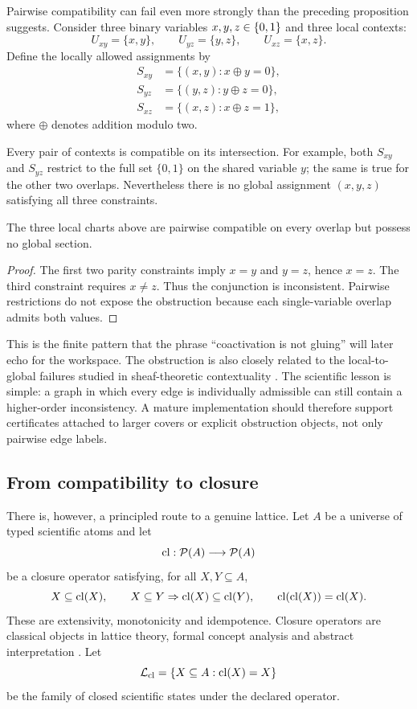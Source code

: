Pairwise compatibility can fail even more strongly than the preceding proposition suggests. Consider three binary variables \(x,y,z\in\{0,1\}\) and three local contexts:
\[
U_{xy}=\{x,y\},\qquad U_{yz}=\{y,z\},\qquad U_{xz}=\{x,z\}.
\]
Define the locally allowed assignments by
\[
\begin{aligned}
S_{xy}&=\{(x,y):x\oplus y=0\},\\
S_{yz}&=\{(y,z):y\oplus z=0\},\\
S_{xz}&=\{(x,z):x\oplus z=1\},
\end{aligned}
\]
where \(\oplus\) denotes addition modulo two.

Every pair of contexts is compatible on its intersection. For example, both \(S_{xy}\) and \(S_{yz}\) restrict to the full set \(\{0,1\}\) on the shared variable \(y\); the same is true for the other two overlaps. Nevertheless there is no global assignment \((x,y,z)\) satisfying all three constraints.

\begin{proposition}
The three local charts above are pairwise compatible on every overlap but possess no global section.
\end{proposition}

\begin{proof}
The first two parity constraints imply \(x=y\) and \(y=z\), hence \(x=z\). The third constraint requires \(x\ne z\). Thus the conjunction is inconsistent. Pairwise restrictions do not expose the obstruction because each single-variable overlap admits both values.
\end{proof}

This is the finite pattern that the phrase ``coactivation is not gluing'' will later echo for the workspace. The obstruction is also closely related to the local-to-global failures studied in sheaf-theoretic contextuality \cite{abramsky2011}. The scientific lesson is simple: a graph in which every edge is individually admissible can still contain a higher-order inconsistency. A mature implementation should therefore support certificates attached to larger covers or explicit obstruction objects, not only pairwise edge labels.

\subsection{From compatibility to closure}

There is, however, a principled route to a genuine lattice. Let \(A\) be a universe of typed scientific atoms and let
\[
\operatorname{cl}:\mathcal P(A)\longrightarrow\mathcal P(A)
\]
be a closure operator satisfying, for all \(X,Y\subseteq A\),
\[
X\subseteq\operatorname{cl}(X),\qquad
X\subseteq Y\Rightarrow\operatorname{cl}(X)\subseteq\operatorname{cl}(Y),\qquad
\operatorname{cl}(\operatorname{cl}(X))=\operatorname{cl}(X).
\]
These are extensivity, monotonicity and idempotence. Closure operators are classical objects in lattice theory, formal concept analysis and abstract interpretation \cite{birkhoff1940,ganter1999,cousot1977}. Let
\[
\mathcal L_{\operatorname{cl}}=\{X\subseteq A:\operatorname{cl}(X)=X\}
\]
be the family of closed scientific states under the declared operator.

